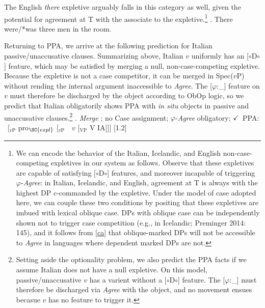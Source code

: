 \documentclass[11pt, letterpaper]{paper_nick}
\newcommand{\fm}[1]{[$\circ$#1$\circ$]}
\begin{document}
The English \emph{there} expletive arguably falls in this category as well, given the potential for agreement at T with the associate to the expletive.\footnote{We can encode the behavior of the Italian, Icelandic, and English non-case-competing expletives in our system as follows. Observe that these expletives are capable of satisfying \fm{D} features, and moreover incapable of triggering $\varphi$-\emph{Agree}: in Italian, Icelandic, and English, agreement at T is always with the highest DP c-commanded by the expletive. Under the model of case adopted here, we can couple these two conditions by positing that these expletives are imbued with lexical oblique case. DPs with oblique case can be independently shown not to trigger case competition (e.g., in Icelandic; Preminger 2014: 145), and it follows from \ref{ca} that oblique-marked DPs will not be accessible to \emph{Agree} in languages where dependent marked DPs are not.}
\ex. There were/*was three men in the room.
  

Returning to PPA, we arrive at the following prediction for Italian passive/unaccusative clauses. Summarizing above, Italian $v$ uniformly has an \fm{D} feature, which may be satisfied by merging a null, non-case-competing expletive. Because the expletive is not a case competitor, it can be merged in Spec($v$P) without rending the internal argument inaccessible to \emph{Agree}. The [$\varphi$:\_] feature on $v$ must therefore be discharged by the object according to ObOp logic, so we predict that Italian obligatorily shows PPA with \emph{in situ} objects in passive and unaccusative clauses.\footnote{\label{it-noexpl}Setting aside the optionality problem, we also predict the PPA facts if we assume Italian does not have a null expletive. On this model, passive/unaccusative $v$ has a varient without a \fm{D} feature. The [$\varphi$:\_] must therefore be discharged via \emph{Agree} with the object, and no movement ensues becasue $v$ has no feature to trigger it.}
\ex. \emph{Merge} ; no Case assignment; $\varphi$-\emph{Agree} obligatory; $\checkmark$\ PPA:\\
\ [$_\text{$v$P}$ \hspace*{-.3cm}pro$_\SC{expl}$ [$_\text{$v$P}$\ \ \hspace*{-.2cm}\hspace*{-.2cm}$v$ [$_\text{VP}$ V \hspace*{-.3cm}IA]]]
[1.2]\\
\end{document}
